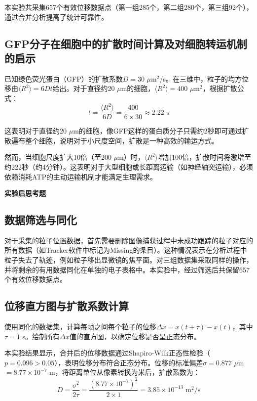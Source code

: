 \documentclass[a4paper]{article}
\begin{document}
本实验共采集657个有效位移数据点（第一组285个，第二组280个，第三组92个），通过合并分析提高了统计可靠性。

\subsection{GFP分子在细胞中的扩散时间计算及对细胞转运机制的启示}

已知绿色荧光蛋白（GFP）的扩散系数$D = 30$ $\mu$m$^2$/s。在三维中，粒子的均方位移由$\langle R^2\rangle = 6Dt$给出。对于直径约20 $\mu$m的细胞，$\langle R^2\rangle = 400$ $\mu$m$^2$，根据扩散公式：
\begin{equation}
	t = \frac{\langle R^2\rangle}{6D} = \frac{400}{6\times30} \approx 2.22 \text{ s}
\end{equation}

这表明对于直径约20 $\mu$m的细胞，像GFP这样的蛋白质分子只需约2秒即可通过扩散遍布整个细胞，说明对于小尺度空间，扩散是一种高效的输运方式。

然而，当细胞尺度扩大10倍（至200 $\mu$m）时，$\langle R^2\rangle$增加100倍，扩散时间将激增至约222秒（约4分钟）。这表明对于大型细胞或长距离运输（如神经轴突运输），必须依赖消耗ATP的主动运输机制才能满足生理需求。

\vspace{1em}
\noindent\textbf{实验后思考题}
\vspace{0.5em}

\subsection{数据筛选与同化}

对于采集的粒子位置数据，首先需要删除图像捕获过程中未成功跟踪的粒子对应的所有数据（如Tracker软件中标记为Missing的条目）。这种情况表示在分析过程中粒子失去了轨迹，例如粒子移出显微镜的焦平面。对三组数据集采取同样的操作，并将剩余的有用数据同化在单独的电子表格中。本实验中，经过筛选后共保留657个有效位移数据点。

\subsection{位移直方图与扩散系数计算}

使用同化的数据集，计算每帧之间每个粒子的位移$\Delta x = x(t+\tau) - x(t)$，其中$\tau = 1$ s。绘制所有$\Delta x$值的直方图，以确定位移是否呈正态分布。

本实验结果显示，合并后的位移数据通过Shapiro-Wilk正态性检验（$p = 0.096 > 0.05$），表明位移分布符合正态分布。位移的标准偏差$\sigma = 0.877$ $\mu$m $= 8.77\times10^{-7}$ m，将距离单位从像素转换为米后，扩散系数为：
\begin{equation}
	D = \frac{\sigma^2}{2\tau} = \frac{(8.77\times10^{-7})^2}{2\times1} = 3.85\times10^{-13} \text{ m}^2/\text{s}
\end{equation}
\end{document}
